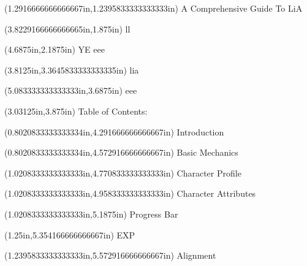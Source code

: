 \documentclass{article}
\begin{document}
\begin{textblock*}{8.0in}(1.2916666666666667in,1.2395833333333333in)
\fontsize{24.00}{28.80}\selectfont
A Comprehensive Guide To LiA
\end{textblock*}
\begin{textblock*}{8.0in}(3.8229166666666665in,1.875in)
\fontsize{6.00}{7.20}\selectfont
ll
\end{textblock*}
\begin{textblock*}{8.0in}(4.6875in,2.1875in)
\fontsize{17.25}{20.70}\selectfont
YE eee
\end{textblock*}
\begin{textblock*}{8.0in}(3.8125in,3.3645833333333335in)
\fontsize{78.00}{93.60}\selectfont
lia
\end{textblock*}
\begin{textblock*}{8.0in}(5.083333333333333in,3.6875in)
\fontsize{3.00}{3.60}\selectfont
eee
\end{textblock*}
\begin{textblock*}{8.0in}(3.03125in,3.875in)
\fontsize{11.25}{13.50}\selectfont
Table of Contents:
\end{textblock*}
\begin{textblock*}{8.0in}(0.8020833333333334in,4.291666666666667in)
\fontsize{10.50}{12.60}\selectfont
Introduction
\end{textblock*}
\begin{textblock*}{8.0in}(0.8020833333333334in,4.572916666666667in)
\fontsize{10.50}{12.60}\selectfont
Basic Mechanics
\end{textblock*}
\begin{textblock*}{8.0in}(1.0208333333333333in,4.770833333333333in)
\fontsize{10.50}{12.60}\selectfont
Character Profile
\end{textblock*}
\begin{textblock*}{8.0in}(1.0208333333333333in,4.958333333333333in)
\fontsize{10.50}{12.60}\selectfont
Character Attributes
\end{textblock*}
\begin{textblock*}{8.0in}(1.0208333333333333in,5.1875in)
\fontsize{12.75}{15.30}\selectfont
Progress Bar
\end{textblock*}
\begin{textblock*}{8.0in}(1.25in,5.354166666666667in)
\fontsize{10.50}{12.60}\selectfont
EXP
\end{textblock*}
\begin{textblock*}{8.0in}(1.2395833333333333in,5.572916666666667in)
\fontsize{12.75}{15.30}\selectfont
Alignment
\end{textblock*}
\end{document}
